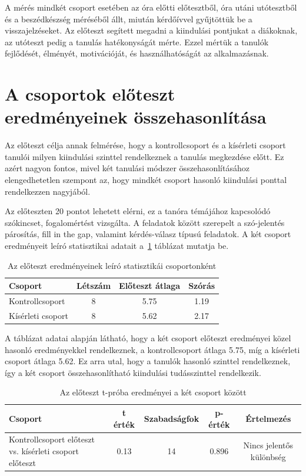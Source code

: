 A mérés mindkét csoport esetében az óra előtti előtesztből, óra utáni utótesztből és a beszédkészség méréséből állt, miután kérdőívvel gyűjtöttük be a visszajelzéseket. Az előteszt segített megadni a kiindulási pontjukat a diákoknak, az utóteszt pedig a tanulás hatékonyságát mérte. Ezzel mértük a tanulók fejlődését, élményét, motivációját, és használhatóságát az alkalmazásnak.

\section{A csoportok előteszt eredményeinek összehasonlítása}

Az előteszt célja annak felmérése, hogy a kontrollcsoport és a kísérleti csoport tanulói milyen kiindulási szinttel rendelkeznek a tanulás megkezdése előtt. Ez azért nagyon fontos, mivel két tanulási módszer összehasonlításához elengedhetetlen szempont az, hogy mindkét csoport hasonló kiindulási ponttal rendelkezzen nagyjából.

Az előteszten 20 pontot lehetett elérni, ez a tanóra témájához kapcsolódó szókincset, fogalomértést vizsgálta. A feladatok között szerepelt a szó-jelentés párosítás, fill in the gap, valamint kérdés-válasz típusú feladatok. A két csoport eredményeit leíró statisztikai adatait a~\ref{tab:eloteszt-leiro-stat} táblázat mutatja be.

\begin{table}[h!]
    \centering
    \begin{tabular}{lccc}
        \hline
        \textbf{Csoport} & \textbf{Létszám} & \textbf{Előteszt átlaga} & \textbf{Szórás} \\
        \hline
        Kontrollcsoport & 8 & 5.75 & 1.19 \\
        Kísérleti csoport & 8 & 5.62 & 2.17 \\
        \hline
    \end{tabular}
    \caption{Az előteszt eredményeinek leíró statisztikái csoportonként}
    \label{tab:eloteszt-leiro-stat}
\end{table}

A táblázat adatai alapján látható, hogy a két csoport előteszt eredményei közel hasonló eredményekkel rendelkeznek, a kontrollcsoport átlaga 5.75, míg a kísérleti csoport átlaga 5.62. Ez arra utal, hogy a tanulók hasonló szinttel rendelkeznek, így a két csoport összehasonlítható kiindulási tudásszinttel rendelkezik.

\begin{table}[h!]
    \centering
    \renewcommand{\arraystretch}{1.2}
    \begin{tabular}{p{4cm}cccc}
        \hline
        \textbf{Csoport} & \textbf{t érték} & \textbf{Szabadságfok} & \textbf{p-érték} & \textbf{Értelmezés} \\
        \hline
        Kontrollcsoport előteszt vs. kísérleti csoport előteszt & 0.13 & 14 & 0.896 & Nincs jelentős különbség \\
        \hline
    \end{tabular}
    \caption{Az előteszt t-próba eredményei a két csoport között}
    \label{tab:eloteszt-t-proba}
\end{table}


